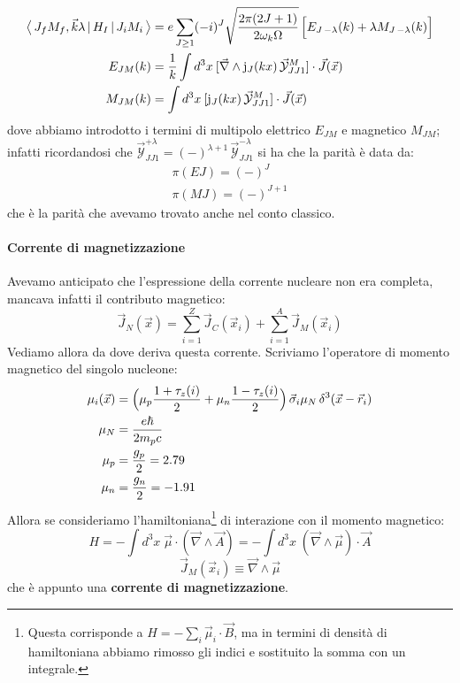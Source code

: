 \begin{displaymath}
\begin{aligned}
\bigl\langle\, J_f M_f,\vec{k}\lambda\, |\,H_I\, |\,J_i M_i\, \bigr\rangle &= e \sum_{J\geq 1} (-i)^J \sqrt{\frac{2\pi(2J+1)}{2\omega_k\Omega}} \, \Bigl [ E_{J\,-\lambda} (k) + \lambda M_{J\,-\lambda} (k) \Bigr ] \\
E_{JM}(k) &= \frac{1}{k}\int d^3x\: [\vec{\nabla}\land \mathrm{j}_J (kx)\, \vec{\mathcal{Y}}^M_{JJ1}]\cdot \vec{J}(\vec{x}) \\
M_{JM}(k) &= \int d^3x\: [\mathrm{j}_J (kx)\, \vec{\mathcal{Y}}^M_{JJ1}]\cdot \vec{J}(\vec{x}) \\
\end{aligned}
\end{displaymath}
dove abbiamo introdotto i termini di multipolo elettrico $E_{JM}$ e magnetico $M_{JM}$; infatti ricordandosi che $\vec{\mathcal{Y}}^{+\lambda}_{JJ1} = (-)^{\lambda+1}\,\vec{\mathcal{Y}}^{-\lambda}_{JJ1}$ si ha che la parità è  data da:
\begin{displaymath}
\begin{array}{l}
    \pi(EJ) = (-)^J \\
    \pi(MJ) = (-)^{J+1}  
\end{array}
\end{displaymath}
che è la parità che avevamo trovato anche nel conto classico.

\paragraph{Corrente di magnetizzazione} Avevamo anticipato che l'espressione della corrente nucleare non era completa, mancava infatti il contributo magnetico:
$$\vec{J}_N(\vec{x}) = \sum_{i=1}^Z \vec{J}_C(\vec{x}_i) + \sum_{i=1}^A \vec{J}_M (\vec{x}_i)$$
Vediamo allora da dove deriva questa corrente. Scriviamo l'operatore di momento magnetico del singolo nucleone:
\begin{displaymath}
\begin{aligned}
\mu_i (\vec{x}) &= \Bigl ( \mu_p \frac{1+\tau_z(i)}{2} + \mu_n \frac{1-\tau_z(i)}{2} \Bigr )\, \vec{\sigma}_i \mu_N \, \delta^3(\vec{x}-\vec{r}_i) \\
\mu_N &= \frac{e\hbar}{2m_pc} \\
\mu_p &= \frac{g_p}{2} = 2.79 \\
\mu_n &= \frac{g_n}{2} = -1.91
\end{aligned}
\end{displaymath}
Allora se consideriamo l'hamiltoniana\footnote{Questa corrisponde a $H = -\sum_i \vec{\mu}_i \cdot \vec{B}$, ma in termini di densità di hamiltoniana abbiamo rimosso gli indici e sostituito la somma con un integrale.} di interazione con il momento magnetico:
$$H = -\int d^3x \; \vec{\mu}\cdot(\vec{\nabla}\land \vec{A}) = -\int d^3x \; (\vec{\nabla}\land\vec{\mu})\cdot \vec{A} $$
$$\vec{J}_M (\vec{x}_i) \equiv \vec{\nabla}\land\vec{\mu}$$
che è appunto una \textbf{corrente di magnetizzazione}.